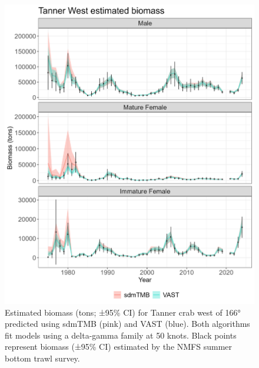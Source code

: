 \documentclass[
]{article}
\begin{document}
\begin{figure}

{\centering \includegraphics[width=1\linewidth,height=1\textheight]{../BAIRDI/Figures/TannerW.biomass.sdmTMBVASTindex} 

}

\caption{Estimated biomass (tons; ±95\% CI) for Tanner crab west of 166° predicted using sdmTMB (pink) and VAST (blue). Both algorithms fit models using a delta-gamma family at 50 knots. Black points represent biomass (±95\% CI) estimated by the NMFS summer bottom trawl survey.}\label{fig:Westbairdi-bio-compare}
\end{figure}
\end{document}
